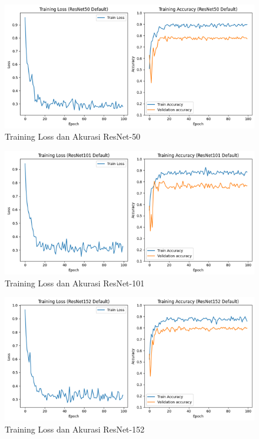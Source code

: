     \begin{figure}[hbtp]
        \centering
        \includegraphics[scale=0.8]{gambar/TrainingGraphResNet50.png}
        \caption{Training Loss dan Akurasi ResNet-50}
        \label{Img:GraphResNet50}
    \end{figure}
    \begin{figure}[hbtp]
        \centering
        \includegraphics[scale=0.8]{gambar/TrainingGraphResNet101.png}
        \caption{Training Loss dan Akurasi ResNet-101}
        \label{Img:GraphResNet101}
    \end{figure}
    \begin{figure}[hbtp]
        \centering
        \includegraphics[scale=0.8]{gambar/TrainingGraphResNet152.png}
        \caption{Training Loss dan Akurasi ResNet-152}
        \label{Img:GraphResNet152}
    \end{figure}

